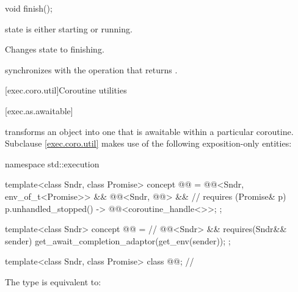 %
\begin{itemdecl}
void finish();
\end{itemdecl}

\begin{itemdescr}
\pnum
\expects
state is either starting or running.

\pnum
\effects
Changes state to finishing.

\pnum
\sync
{} synchronizes with the  operation
that returns .
\end{itemdescr}

[exec.coro.util]{Coroutine utilities}

[exec.as.awaitable]{}

\pnum
{} transforms an object into one
that is awaitable within a particular coroutine.
Subclause \ref{exec.coro.util} makes use of
the following exposition-only entities:
\begin{codeblock}
namespace std::execution {
  template<class Sndr, class Promise>
    concept @@ =
      @@<Sndr, env_of_t<Promise>> &&
      @@<Sndr, @@> &&    // \seebelow
      requires (Promise& p) {
        { p.unhandled_stopped() } -> @@<coroutine_handle<>>;
      };

  template<class Sndr>
    concept @@ =            // \expos
      @@<Sndr> &&
      requires(Sndr&& sender) {
        get_await_completion_adaptor(get_env(sender));
      };

  template<class Sndr, class Promise>
    class @@;                                     // \expos
}
\end{codeblock}

\pnum
The type  is equivalent to:

